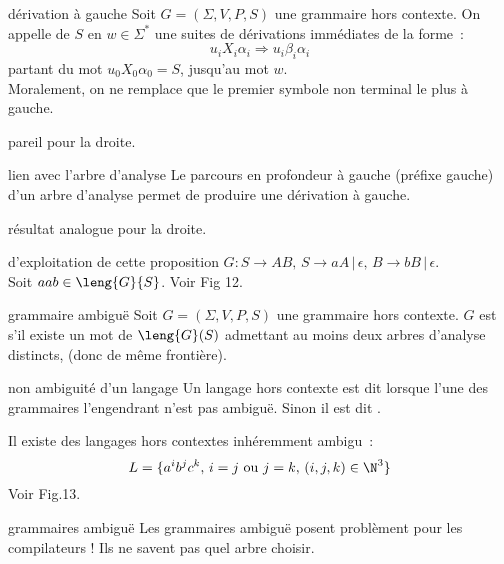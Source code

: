 \begin{adjustwidth}{-3cm}{-3cm}
\begin{definition}{}{dérivation à gauche}
    Soit $G = (\Sigma, V,P,S)$ une grammaire hors contexte. On appelle  de $S$ en $w \in \Sigma^*$ une suites de dérivations immédiates de la forme~:
    $$u_iX_i\alpha_i \Rightarrow u_i \beta_i \alpha_i$$
    partant du mot $u_0X_0\alpha_0 = S$, jusqu'au mot $w$.\\
    Moralement, on ne remplace que le premier symbole non terminal le plus à gauche.
\end{definition}
pareil pour la droite.

\begin{proposition}{}{lien avec l'arbre d'analyse}
    Le parcours en profondeur à gauche (préfixe gauche) d'un arbre d'analyse permet de produire une dérivation à gauche.
\end{proposition}
résultat analogue pour la droite.

\begin{exemple}{}{d'exploitation de cette proposition}
    $G : S \rightarrow AB,\, S \rightarrow aA\,\vert\, \epsilon,\, B \rightarrow bB\,\vert\, \epsilon$.\\
    Soit $aab \in \leng{G}{S}$. Voir Fig 12.
\end{exemple}


\begin{definition}{}{grammaire ambiguë}
    Soit $G = (\Sigma, V,P,S)$ une grammaire hors contexte. $G$ est  s'il existe un mot de $\leng{G}(S)$ admettant au moins deux arbres d'analyse distincts, (donc de même frontière).
\end{definition}

\begin{definition}{}{non ambiguité d'un langage}
    Un langage hors contexte est dit  lorsque l'une des grammaires l'engendrant n'est pas ambiguë.
    Sinon il est dit .
\end{definition}

\begin{remarque}{}{}
    Il existe des langages hors contextes inhéremment ambigu~: 
    $$L = \{a^ib^jc^k,\, i=j \text{ ou } j=k,\, (i,j,k)\in \N^3\}$$
    Voir Fig.13.
\end{remarque}

\begin{remarque}{}{grammaires ambiguë}
    Les grammaires ambiguë posent problèment pour les compilateurs ! Ils ne savent pas quel arbre choisir.
\end{remarque}


\end{adjustwidth}
